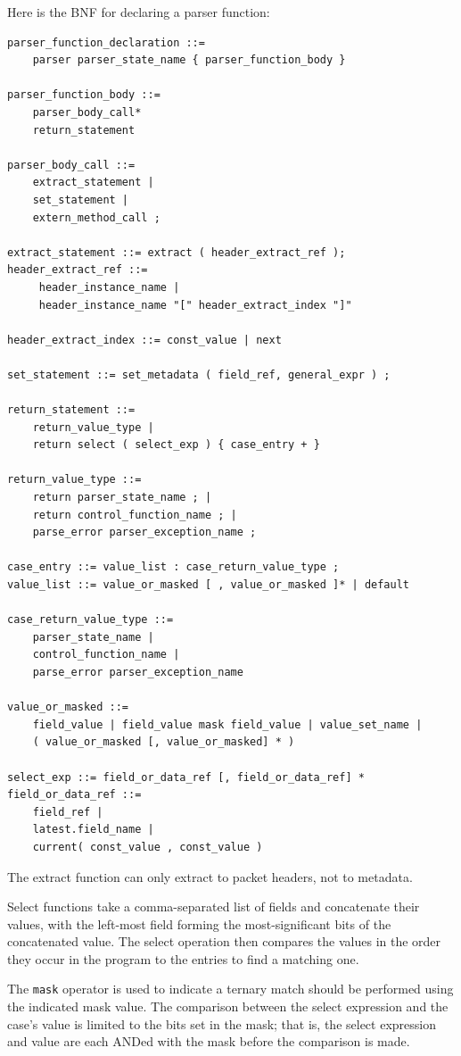 \documentclass[12pt]{article}
\begin{document}

Here is the BNF for declaring a parser function:

\begin{lstlisting}[style=BNFstyle]
parser_function_declaration ::=
    parser parser_state_name { parser_function_body }

parser_function_body ::=
    parser_body_call*
    return_statement

parser_body_call ::=
    extract_statement |
    set_statement |
    extern_method_call ;

extract_statement ::= extract ( header_extract_ref ); 
header_extract_ref ::=
     header_instance_name |
     header_instance_name "[" header_extract_index "]"

header_extract_index ::= const_value | next

set_statement ::= set_metadata ( field_ref, general_expr ) ;

return_statement ::=
    return_value_type |
    return select ( select_exp ) { case_entry + }

return_value_type ::= 
    return parser_state_name ; | 
    return control_function_name ; | 
    parse_error parser_exception_name ;

case_entry ::= value_list : case_return_value_type ;
value_list ::= value_or_masked [ , value_or_masked ]* | default

case_return_value_type ::= 
    parser_state_name | 
    control_function_name | 
    parse_error parser_exception_name

value_or_masked ::=
    field_value | field_value mask field_value | value_set_name |
    ( value_or_masked [, value_or_masked] * )
 
select_exp ::= field_or_data_ref [, field_or_data_ref] * 
field_or_data_ref ::=
    field_ref |
    latest.field_name |
    current( const_value , const_value )
\end{lstlisting}

The extract function can only extract to packet headers, not to metadata.

Select functions take a comma-separated list of fields and concatenate their 
values, with the left-most field forming the most-significant bits of the 
concatenated value.  The select operation then compares the values in the 
order they occur in the program to the entries to find a matching one.

The \texttt{mask} operator is used to indicate a ternary match should be performed 
using the indicated mask value. The comparison between the select expression 
and the case's value is limited to the bits set in the mask; that is, the 
select expression and value are each ANDed with the mask before the comparison 
is made. 
\end{document}
